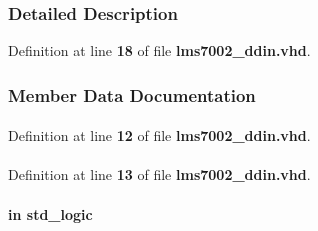\subsubsection{Detailed Description}


Definition at line {\bf 18} of file {\bf lms7002\+\_\+ddin.\+vhd}.



\subsubsection{Member Data Documentation}
\paragraph[{altera\+\_\+mf}]{\hspace{0.3cm}{\ttfamily [Library]}}\label{classlms7002__ddin_ad57cd8d31a38ff87ac163fb47757ffbf}


Definition at line {\bf 12} of file {\bf lms7002\+\_\+ddin.\+vhd}.

\paragraph[{altera\+\_\+mf\+\_\+components}]{\hspace{0.3cm}{\ttfamily [Package]}}\label{classlms7002__ddin_a421d8a97945a4307e385df667430facb}


Definition at line {\bf 13} of file {\bf lms7002\+\_\+ddin.\+vhd}.

\paragraph[{clk}]{ {\bfseries \textcolor{keywordflow}{in}\textcolor{vhdlchar}{ }} {\bfseries \textcolor{comment}{std\+\_\+logic}\textcolor{vhdlchar}{ }} \hspace{0.3cm}{\ttfamily [Port]}}\label{classlms7002__ddin_a4a4609c199d30b3adebbeb3a01276ec5}


